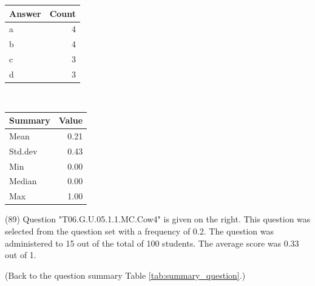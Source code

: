 \documentclass[12pt,nohyper]{tufte-handout}\usepackage[]{graphicx}\usepackage[]{color}
\begin{document}
\begin{center}%
\begin{tabular}{lr}
  \hline
Answer & Count \\ 
  \hline
a &   4 \\ 
  b &   4 \\ 
  c &   3 \\ 
  d &   3 \\ 
   \hline
\end{tabular}
~~~~~~~~%
\begin{tabular}{lr}
  \hline
Summary & Value \\ 
  \hline
Mean & 0.21 \\ 
  Std.dev & 0.43 \\ 
  Min & 0.00 \\ 
  Median & 0.00 \\ 
  Max & 1.00 \\ 
   \hline
\end{tabular}
\end{center}\newpage{} (89) Question "T06.G.U.05.1.1.MC.Cow4" is given on the right. This question was selected from the question set with a frequency of 0.2. The question was administered to 15 out of the total of 100 students. The average score was 0.33 out of 1.

 (Back to the question summary Table \ref{tab:summary_question}.)
\end{document}
